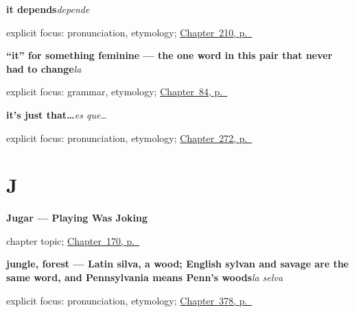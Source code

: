 \noindent\begin{minipage}[t]{\linewidth}
\raggedright
\textbf{it depends}\enspace\emph{depende}\par
\footnotesize explicit focus: pronunciation, etymology; \hyperref[ch:sintesis-condiciones]{Chapter~210, p.~\pageref*{ch:sintesis-condiciones}}
\end{minipage}\par\smallskip

\noindent\begin{minipage}[t]{\linewidth}
\raggedright
\textbf{\textquotedblleft{}it\textquotedblright{} for something feminine — the one word in this pair that never had to change}\enspace\emph{la}\par
\footnotesize explicit focus: grammar, etymology; \hyperref[ch:pronoun-la]{Chapter~84, p.~\pageref*{ch:pronoun-la}}
\end{minipage}\par\smallskip

\noindent\begin{minipage}[t]{\linewidth}
\raggedright
\textbf{it's just that…}\enspace\emph{es que…}\par
\footnotesize explicit focus: pronunciation, etymology; \hyperref[ch:entrelineas]{Chapter~272, p.~\pageref*{ch:entrelineas}}
\end{minipage}\par\smallskip

\section*{J}

\noindent\begin{minipage}[t]{\linewidth}
\raggedright
\textbf{Jugar --- Playing Was Joking}\par
\footnotesize chapter topic; \hyperref[ch:spanish-jugar]{Chapter~170, p.~\pageref*{ch:spanish-jugar}}
\end{minipage}\par\smallskip

\noindent\begin{minipage}[t]{\linewidth}
\raggedright
\textbf{jungle, forest — Latin silva, a wood; English sylvan and savage are the same word, and Pennsylvania means Penn's woods}\enspace\emph{la selva}\par
\footnotesize explicit focus: pronunciation, etymology; \hyperref[ch:la-selva-y-el-prado]{Chapter~378, p.~\pageref*{ch:la-selva-y-el-prado}}
\end{minipage}\par\smallskip

